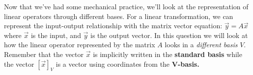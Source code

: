 \begin{enumerate}

  \end{enumerate}

  Now that we've had some mechanical practice, we'll look at the representation of linear operators through different bases. 
  For a linear transformation, we can represent the input-output relationship with the matrix vector equation:
  $\vec{y} = A \vec{x}$ where $\vec{x}$ is the input, and $\vec{y}$ is the output vector.
  In this question we will look at how the linear operator represented by the matrix $A$ looks in a \textit{different basis} $V$.
  Remember that the vector $\vec{x}$ is implicitly written in the \textbf{standard basis} while the vector $[\vec{x}]_V$ is a vector using coordinates from the \textbf{V-basis.}

